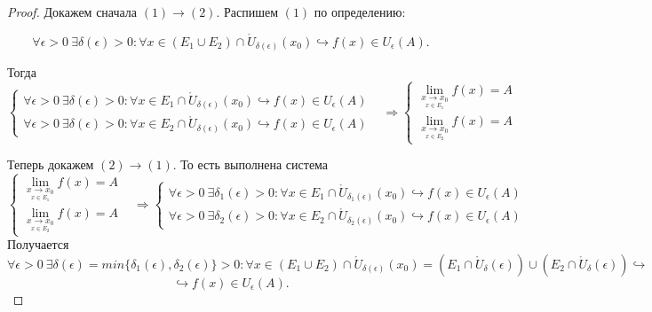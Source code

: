 \begin{proof}
    Докажем сначала $(1) \to (2)$. Распишем $(1)$ по определению:

    $$\forall \epsilon > 0 \  \exists \delta (\epsilon) > 0: \forall x \in (E_{1} \cup E_{2}) \cap \mathring{U}_{\delta (\epsilon)} (x_{0}) \hookrightarrow f (x) \in U_{\epsilon} (A).$$

    Тогда
    $
    \begin{cases}
        \forall \epsilon > 0 \  \exists \delta (\epsilon) > 0: \forall x \in E_{1} \cap \mathring{U}_{\delta (\epsilon)} (x_{0}) \hookrightarrow f (x) \in U_{\epsilon} (A) \\
        \forall \epsilon > 0 \  \exists \delta (\epsilon) > 0: \forall x \in E_{2} \cap \mathring{U}_{\delta (\epsilon)} (x_{0}) \hookrightarrow f (x) \in U_{\epsilon} (A) &
    \end{cases}
    \Rightarrow
    \begin{cases}
            \lim\limits_{\underset{x \in E_{1}}{x\to x_{0}}} f (x) = A\\
            \lim\limits_{\underset{x \in E_{2}}{x\to x_{0}}} f (x) = A& 
        \end{cases}
    $

    Теперь докажем $(2) \to (1)$. То есть выполнена система
    $$
    \begin{cases}
            \lim\limits_{\underset{x \in E_{1}}{x\to x_{0}}} f (x) = A\\
            \lim\limits_{\underset{x \in E_{2}}{x\to x_{0}}} f (x) = A& 
        \end{cases}
    \Rightarrow
    \begin{cases}
        \forall \epsilon > 0 \  \exists \delta_{1} (\epsilon) > 0: \forall x \in E_{1} \cap \mathring{U}_{\delta_{1} (\epsilon)} (x_{0}) \hookrightarrow f (x) \in U_{\epsilon} (A) \\
        \forall \epsilon > 0 \  \exists \delta_{2} (\epsilon) > 0: \forall x \in E_{2} \cap \mathring{U}_{\delta_{2} (\epsilon)} (x_{0}) \hookrightarrow f (x) \in U_{\epsilon} (A) &
    \end{cases}
    $$
    Получается
    $$ \forall \epsilon > 0 \  \exists \delta (\epsilon) = min \{ \delta_{1} (\epsilon), \delta_{2} (\epsilon)\} > 0: \forall x \in (E_{1} \cup E_{2}) \cap \mathring{U}_{\delta (\epsilon)} (x_{0}) = (E_{1} \cap \mathring{U}_{\delta} (\epsilon)) \cup (E_{2} \cap \mathring{U}_{\delta} (\epsilon)) \hookrightarrow$$
    $$\hookrightarrow f (x) \in U_{\epsilon} (A).$$
\end{proof}
